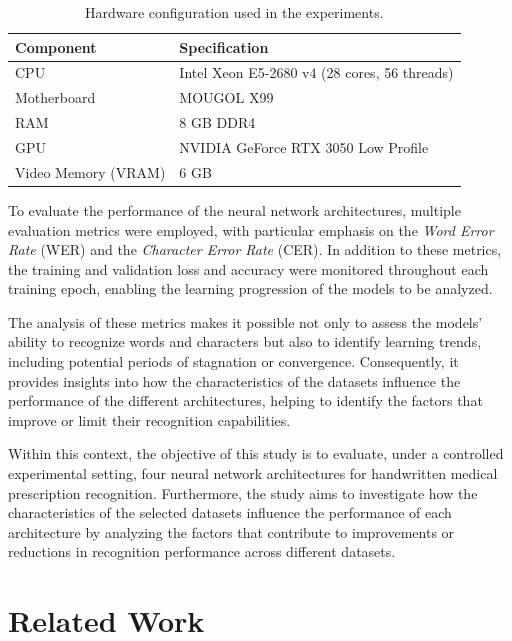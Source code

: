 \documentclass[11pt,a4paper]{article}
\begin{document}
\begin{table}[H]
	\centering
	\caption{Hardware configuration used in the experiments.}
	\label{tab:hardware}
	\begin{tabular}{ll}
		\hline
		\textbf{Component} & \textbf{Specification} \\ \hline
		CPU & Intel Xeon E5-2680 v4 (28 cores, 56 threads) \\
		Motherboard & MOUGOL X99 \\
		RAM & 8 GB DDR4 \\
		GPU & NVIDIA GeForce RTX 3050 Low Profile \\
		Video Memory (VRAM) & 6 GB \\ \hline
	\end{tabular}
\end{table}



To evaluate the performance of the neural network architectures, multiple evaluation metrics were employed, with particular emphasis on the \textit{Word Error Rate} (WER) and the \textit{Character Error Rate} (CER). In addition to these metrics, the training and validation loss and accuracy were monitored throughout each training epoch, enabling the learning progression of the models to be analyzed.

The analysis of these metrics makes it possible not only to assess the models' ability to recognize words and characters but also to identify learning trends, including potential periods of stagnation or convergence. Consequently, it provides insights into how the characteristics of the datasets influence the performance of the different architectures, helping to identify the factors that improve or limit their recognition capabilities.

Within this context, the objective of this study is to evaluate, under a controlled experimental setting, four neural network architectures for handwritten medical prescription recognition. Furthermore, the study aims to investigate how the characteristics of the selected datasets influence the performance of each architecture by analyzing the factors that contribute to improvements or reductions in recognition performance across different datasets.



\section{Related Work}
\label{sec:related-work}
\end{document}
